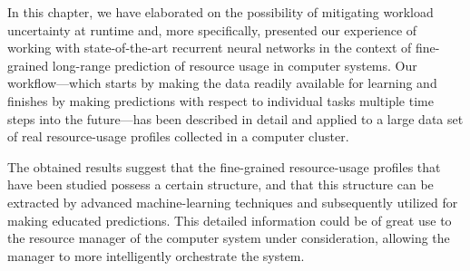 In this chapter, we have elaborated on the possibility of mitigating workload
uncertainty at runtime and, more specifically, presented our experience of
working with state-of-the-art recurrent neural networks in the context of
fine-grained long-range prediction of resource usage in computer systems. Our
workflow---which starts by making the data readily available for learning and
finishes by making predictions with respect to individual tasks multiple time
steps into the future---has been described in detail and applied to a large data
set of real resource-usage profiles collected in a computer cluster.

The obtained results suggest that the fine-grained resource-usage profiles that
have been studied possess a certain structure, and that this structure can be
extracted by advanced machine-learning techniques and subsequently utilized for
making educated predictions. This detailed information could be of great use to
the resource manager of the computer system under consideration, allowing the
manager to more intelligently orchestrate the system.
